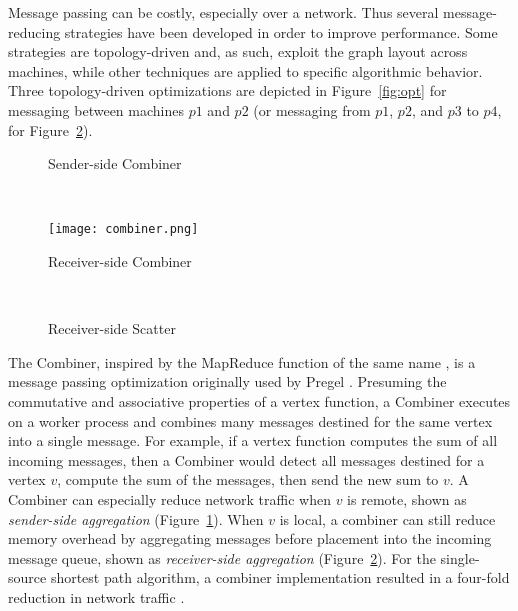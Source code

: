 \documentclass[reprint,twocolumn,showpacs,preprintnumbers,amsmath, aps,pre,amssymb]{revtex4-1}
\begin{document}
Message passing can be costly, especially over a network. Thus several message-reducing strategies have been developed in order to improve performance.  Some strategies are topology-driven and, as such, exploit the graph layout across machines, while other techniques are applied to specific algorithmic behavior.  Three topology-driven optimizations are depicted in Figure~\ref{fig:opt} for messaging between machines $p1$ and $p2$ (or messaging from $p1$, $p2$, and $p3$ to $p4$, for Figure~\ref{fig:rec_agg}). 

\begin{figure*}
    \centering
    
    \begin{subfigure}[b]{.3\textwidth}
        \centering
        \caption{Sender-side Combiner}
        \label{fig:send_agg}
    \end{subfigure}
    ~
    \begin{subfigure}[b]{.3\textwidth}
        \centering
        \texttt{[image: combiner.png]}
        \caption{Receiver-side Combiner}
        \label{fig:rec_agg}
    \end{subfigure}
    ~
    \begin{subfigure}[b]{.3\textwidth}
        \centering
        \caption{Receiver-side Scatter}
        \label{fig:rec_scat}
    \end{subfigure}
    
    \caption{Partition-driven optimization strategies for distributed message passing.  The Combiner technique employs both Sender-side and Receiver-side Combiners.}
    \label{fig:opt}
\end{figure*}

The Combiner, inspired by the MapReduce function of the same name \cite{Dean2008}, is a message passing optimization originally used by Pregel \cite{Malewicz2010}.  Presuming the commutative and associative properties of a vertex function, a Combiner executes on a worker process and combines many messages destined for the same vertex into a single message.  For example, if a vertex function computes the sum of all incoming messages, then a Combiner would detect all messages destined for a vertex $v$, compute the sum of the messages, then send the new sum to $v$.  A Combiner can especially reduce network traffic when $v$ is remote, shown as  {\em sender-side aggregation} (Figure~\ref{fig:send_agg}).  When $v$ is local, a combiner can still reduce memory overhead by aggregating messages before placement into the incoming message queue, shown as {\em receiver-side aggregation} (Figure~\ref{fig:rec_agg}). For the single-source shortest path algorithm, a combiner implementation resulted in a four-fold reduction in network traffic \cite{Malewicz2010}.
\end{document}
